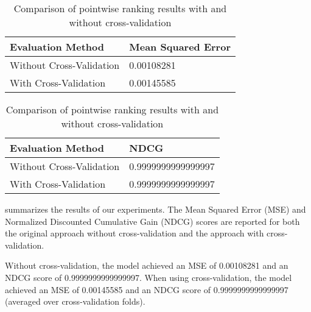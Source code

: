 \begin{table}[h]
\centering
\begin{tabular}{ll}
\textbf{Evaluation Method}             & \textbf{Mean Squared Error} \\ \hline
\multicolumn{1}{l|}{Without Cross-Validation} & 0.00108281          \\
\multicolumn{1}{l|}{\cellcolor{verylightgray}With Cross-Validation} & \cellcolor{verylightgray}0.00145585 \\ \hline
\end{tabular}
\begin{tabular}{ll}
\textbf{Evaluation Method}             & \textbf{NDCG} \\ \hline
\multicolumn{1}{l|}{Without Cross-Validation} & 0.9999999999999997          \\
\multicolumn{1}{l|}{\cellcolor{verylightgray}With Cross-Validation} & \cellcolor{verylightgray}0.9999999999999997 \\ \hline
\end{tabular}
\caption{Comparison of pointwise ranking results with and without cross-validation}
\label{tab:ranking_results}
\end{table}


 summarizes the results of our experiments. The Mean Squared Error (MSE) and Normalized Discounted Cumulative Gain (NDCG) scores are reported for both the original approach without cross-validation and the approach with cross-validation.

Without cross-validation, the model achieved an MSE of 0.00108281 and an NDCG score of 0.9999999999999997. When using cross-validation, the model achieved an MSE of 0.00145585 and an NDCG score of 0.9999999999999997 (averaged over cross-validation folds).

